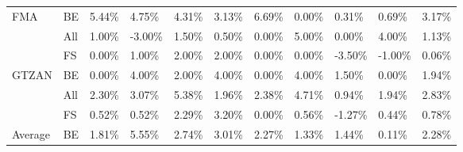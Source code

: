 \begin{table}[H]
{\begin{tabular}{lllllllllll}
    \multirow{-3}{*}{FMA}     & \multicolumn{1}{l|}{\cellcolor[HTML]{EFEFEF}BE}  & \cellcolor[HTML]{EFEFEF}5.44\% & \cellcolor[HTML]{EFEFEF}4.75\% & \cellcolor[HTML]{EFEFEF}4.31\%  & \cellcolor[HTML]{EFEFEF}3.13\% & \cellcolor[HTML]{EFEFEF}6.69\% & \cellcolor[HTML]{EFEFEF}0.00\% & \cellcolor[HTML]{EFEFEF}0.31\%  & \cellcolor[HTML]{EFEFEF}0.69\%  & \cellcolor[HTML]{EFEFEF}3.17\% \\ \cline{1-2}
                              & \multicolumn{1}{l|}{All}                         & 1.00\%                         & -3.00\%                        & 1.50\%                          & 0.50\%                         & 0.00\%                         & 5.00\%                         & 0.00\%                          & 4.00\%                          & 1.13\%                         \\
                              & \multicolumn{1}{l|}{\cellcolor[HTML]{EFEFEF}FS}  & \cellcolor[HTML]{EFEFEF}0.00\% & \cellcolor[HTML]{EFEFEF}1.00\% & \cellcolor[HTML]{EFEFEF}2.00\%  & \cellcolor[HTML]{EFEFEF}2.00\% & \cellcolor[HTML]{EFEFEF}0.00\% & \cellcolor[HTML]{EFEFEF}0.00\% & \cellcolor[HTML]{EFEFEF}-3.50\% & \cellcolor[HTML]{EFEFEF}-1.00\% & \cellcolor[HTML]{EFEFEF}0.06\% \\
    \multirow{-3}{*}{GTZAN}   & \multicolumn{1}{l|}{BE}                          & 0.00\%                         & 4.00\%                         & 2.00\%                          & 4.00\%                         & 0.00\%                         & 4.00\%                         & 1.50\%                          & 0.00\%                          & 1.94\%                         \\ \cline{1-2}
                              & \multicolumn{1}{l|}{\cellcolor[HTML]{EFEFEF}All} & \cellcolor[HTML]{EFEFEF}2.30\% & \cellcolor[HTML]{EFEFEF}3.07\% & \cellcolor[HTML]{EFEFEF}5.38\%  & \cellcolor[HTML]{EFEFEF}1.96\% & \cellcolor[HTML]{EFEFEF}2.38\% & \cellcolor[HTML]{EFEFEF}4.71\% & \cellcolor[HTML]{EFEFEF}0.94\%  & \cellcolor[HTML]{EFEFEF}1.94\%  & \cellcolor[HTML]{EFEFEF}2.83\% \\
                              & \multicolumn{1}{l|}{FS}                          & 0.52\%                         & 0.52\%                         & 2.29\%                          & 3.20\%                         & 0.00\%                         & 0.56\%                         & -1.27\%                         & 0.44\%                          & 0.78\%                         \\
    \multirow{-3}{*}{Average} & \multicolumn{1}{l|}{\cellcolor[HTML]{EFEFEF}BE}  & \cellcolor[HTML]{EFEFEF}1.81\% & \cellcolor[HTML]{EFEFEF}5.55\% & \cellcolor[HTML]{EFEFEF}2.74\%  & \cellcolor[HTML]{EFEFEF}3.01\% & \cellcolor[HTML]{EFEFEF}2.27\% & \cellcolor[HTML]{EFEFEF}1.33\% & \cellcolor[HTML]{EFEFEF}1.44\%  & \cellcolor[HTML]{EFEFEF}0.11\%  & \cellcolor[HTML]{EFEFEF}2.28\%
    \end{tabular}}
\end{table}

